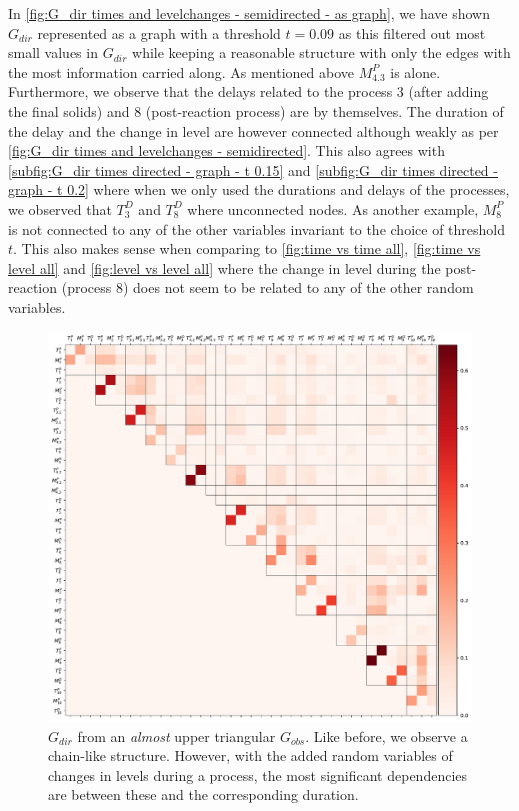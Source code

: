 \documentclass[../Thesis.tex]{subfiles}
\begin{document}
In \autoref{fig:G_dir times and levelchanges - semidirected - as graph}, we have shown $G_{dir}$ represented as a graph with a threshold $t = 0.09$ as this filtered out most small values in $G_{dir}$ while keeping a reasonable structure with only the edges with the most information carried along. As mentioned above $M^P_{4.3}$ is alone. Furthermore, we observe that the delays related to the process $3$ (after adding the final solids) and $8$ (post-reaction process) are by themselves. The duration of the delay and the change in level are however connected although weakly as per \autoref{fig:G_dir times and levelchanges - semidirected}. This also agrees with \autoref{subfig:G_dir times directed - graph - t 0.15} and \autoref{subfig:G_dir times directed - graph - t 0.2} where when we only used the durations and delays of the processes, we observed that $T^D_3$ and $T^D_8$ where unconnected nodes. As another example, $M^P_8$ is not connected to any of the other variables invariant to the choice of threshold $t$. This also makes sense when comparing to \autoref{fig:time vs time all}, \autoref{fig:time vs level all} and \autoref{fig:level vs level all} where the change in level during the post-reaction (process $8$) does not seem to be related to any of the other random variables.

\begin{figure}[H]
    \centering
    \includegraphics[width = \linewidth]{figures/Cycle data/G_dir times and levelchanges - semi-directed.pdf}
    \caption{$G_{dir}$ from an \textit{almost} upper triangular $G_{obs}$. Like before, we observe a chain-like structure. However, with the added random variables of changes in levels during a process, the most significant dependencies are between these and the corresponding duration.}
    \label{fig:G_dir times and levelchanges - semidirected}
\end{figure}
\newpage
\end{document}
